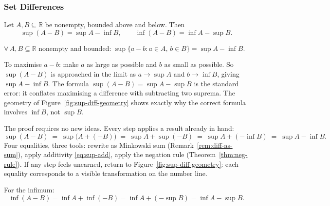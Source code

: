 \subsubsection{Set Differences}

\begin{theorem}
\label{thm:sup-diff}
Let $A, B \subseteq \mathbb{R}$ be nonempty, bounded above and below. Then
\[
\sup(A-B) = \sup A - \inf B, \qquad \inf(A-B) = \inf A - \sup B.
\]
\end{theorem}

\begin{remark*}
$\forall\, A, B \subseteq \mathbb{R}$ nonempty and bounded:
$\sup\{a - b : a \in A,\, b \in B\} = \sup A - \inf B$.
\end{remark*}

\begin{remark*}[Intuition]
To maximise $a - b$: make $a$ as large as possible and $b$ as small as
possible.
So $\sup(A-B)$ is approached in the limit as $a \to \sup A$ and
$b \to \inf B$, giving $\sup A - \inf B$.
The formula $\sup(A-B) = \sup A - \sup B$ is the standard error:
it conflates maximising a difference with subtracting two suprema.
The geometry of Figure~\ref{fig:sup-diff-geometry} shows exactly why the
correct formula involves $\inf B$, not $\sup B$.
\end{remark*}

\begin{remark*}
The proof requires no new ideas. Every step applies a result already in hand:
\[
\sup(A-B)
\;=\; \sup\bigl(A+(-B)\bigr)
\;=\; \sup A + \sup(-B)
\;=\; \sup A + (-\inf B)
\;=\; \sup A - \inf B.
\]
Four equalities, three tools: rewrite as Minkowski sum
(Remark~\ref{rem:diff-as-sum}),
apply additivity \eqref{eq:sup-add},
apply the negation rule (Theorem~\ref{thm:neg-rule}).
If any step feels unearned, return to Figure~\ref{fig:sup-diff-geometry}:
each equality corresponds to a visible transformation on the number line.

For the infimum:
\[
\inf(A-B) = \inf A + \inf(-B) = \inf A + (-\sup B) = \inf A - \sup B.
\]
\end{remark*}


